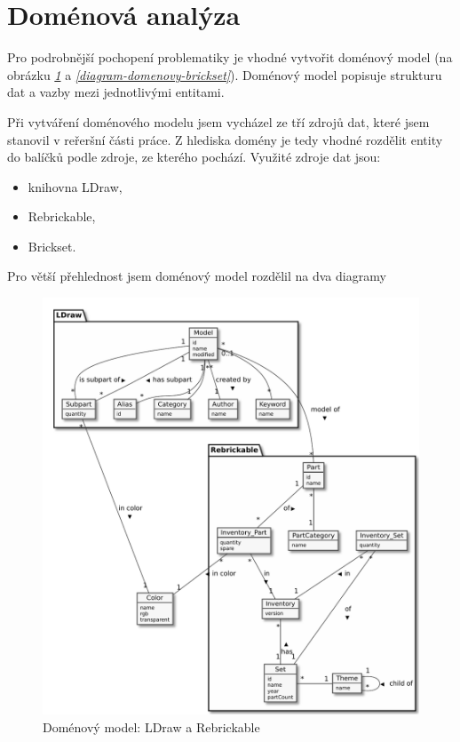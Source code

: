 \section{Doménová analýza}
Pro podrobnější pochopení problematiky je vhodné vytvořit doménový model (na obrázku \emph{\ref{diagram-domenovy}} a \emph{\ref{diagram-domenovy-brickset}}). Doménový model popisuje strukturu dat a vazby mezi jednotlivými entitami. 

Při vytváření doménového modelu jsem vycházel ze tří zdrojů dat, které jsem stanovil v reřeršní části práce. Z hlediska domény je tedy vhodné rozdělit entity do balíčků podle zdroje, ze kterého pochází. Využité zdroje dat jsou: 
\begin{itemize}
  \item knihovna LDraw,
  \item Rebrickable,
  \item Brickset.
\end{itemize}

Pro větší přehlednost jsem doménový model rozdělil na dva diagramy 


\begin{figure}[htbp]
    \centering
    \includegraphics[width=\textwidth,height=\textheight,keepaspectratio]{pdfs/diagram}
    \caption{Doménový model: LDraw a Rebrickable\label{diagram-domenovy}}
  \end{figure}

